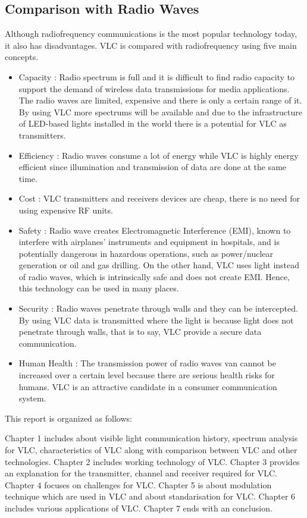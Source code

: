\subsection{Comparison with Radio Waves}
Although radiofrequency communications is the most popular
technology today, it also has disadvantages. VLC is compared
with radiofrequency using five main concepts.
\begin{itemize}
  \item Capacity :
  Radio spectrum is full and it is difficult to find radio
capacity to support the demand of wireless data transmissions
for media applications. The radio waves are limited, expensive
and there is only a certain range of it. By using VLC more
spectrums will be available and due to the infrastructure of
LED-based lights installed in the world there is a potential for
VLC as transmitters.
  \item Efficiency :
  Radio waves consume a lot of energy while VLC is
highly energy efficient since illumination and transmission of
data are done at the same time.
  \item Cost :
  VLC transmitters and receivers devices are cheap, there
is no need for using expensive RF units.
  \item Safety :
  Radio wave creates Electromagnetic Interference
(EMI), known to interfere with airplanes’ instruments and
equipment in hospitals, and is potentially dangerous in
hazardous operations, such as power/nuclear generation or oil
and gas drilling. On the other hand, VLC uses light instead of
radio waves, which is intrinsically safe and does not create
EMI. Hence, this technology can be used in many places.
  \item Security :
  Radio waves penetrate through walls and they can be
intercepted. By using VLC data is transmitted where the light is
because light does not penetrate through walls, that is to say,
VLC provide a secure data communication.
\item Human Health :
The transmission power of radio waves van
cannot be increased over a certain level because there are
serious health risks for humans. VLC is an attractive candidate
in a consumer communication system.
\end{itemize}

This report is organized as follows:

Chapter 1 includes about visible light communication history, spectrum analysis for VLC, characteristics of VLC along with comparison between VLC and other technologies. Chapter 2 includes working technology of VLC. Chapter 3 provides an explanation for the transmitter, channel and receiver required for VLC. Chapter 4 focuses on challenges for VLC. Chapter 5 is about modulation technique which are used in VLC and about standarisation for VLC. Chapter 6 includes various applications of VLC. Chapter 7 ends with an conclusion. 